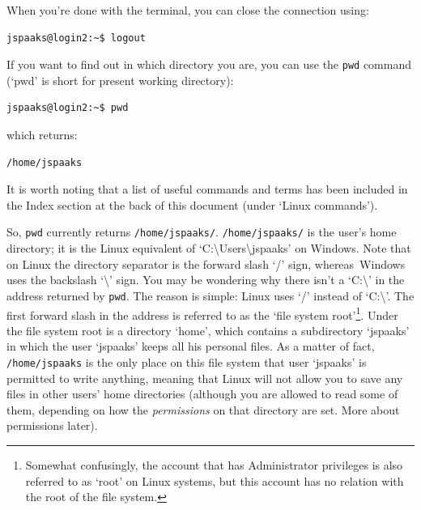 When you're done with the terminal, you can close the connection using:
\begin{lstlisting}[style=basic,style=bash]
jspaaks@login2:~$ logout
\end{lstlisting}


If you want to find out in which directory you are, you can use the \lstinline[style=bashinline]{pwd} command (`pwd' is short for present working directory):
\begin{lstlisting}[style=basic,style=bash]
jspaaks@login2:~$ pwd
\end{lstlisting}
which returns:
\begin{lstlisting}[style=basic,style=bash]
/home/jspaaks
\end{lstlisting}
It is worth noting that a list of useful commands and terms has been included in the Index section at the back of this document (under `Linux commands').

So, \texttt{pwd} currently returns \texttt{/home/jspaaks/}. \texttt{/home/jspaaks/} is the user's home directory; it is the Linux equivalent of `C:\textbackslash{}Users\textbackslash{}jspaaks' on Windows. Note that on Linux the directory separator  is the forward slash `/' sign, whereas~Windows uses the backslash `\textbackslash{}' sign. You may be wondering why there isn't a `C:\textbackslash{}' in the address returned by \texttt{pwd}. The reason is simple: Linux uses `/' instead of `C:\textbackslash{}'. The first forward slash in the address is referred to as the `file system root'\footnote{Somewhat confusingly, the account that has Administrator privileges is also referred to as `root' on Linux systems, but this account has no relation with the root of the file system.}. Under the file system root is a directory `home', which contains a subdirectory `jspaaks' in which the user `jspaaks' keeps all his personal files. As a matter of fact, \texttt{/home/jspaaks} is the only place on this file system that user `jspaaks' is permitted to write anything, meaning that Linux will not allow you to save any files in other users' home directories (although you are allowed to read some of them, depending on how the \textit{permissions} on that directory are set. More about permissions later).

